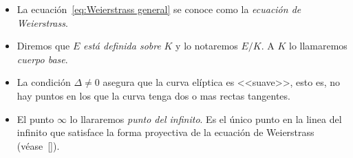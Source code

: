 \begin{nota}\leavevmode
	\begin{itemize}
		\item La ecuación~\eqref{eq:Weierstrass general} se conoce como la \emph{ecuación de Weierstrass}.
		\item Diremos que $E$ \emph{está definida sobre} $K$ y lo notaremos $E/K$. A $K$ lo llamaremos \emph{cuerpo base}.
		\item La condición $\Delta \neq 0$ asegura que la curva elíptica es <<suave>>, esto es, no hay puntos en los que la curva tenga dos o mas rectas tangentes.
		\item El punto $\infty$ lo llararemos \emph{punto del infinito}. Es el único punto en la linea del infinito que satisface la forma proyectiva de la ecuación de Weierstrass (véase~\ref{}).
	\end{itemize}
\end{nota}

